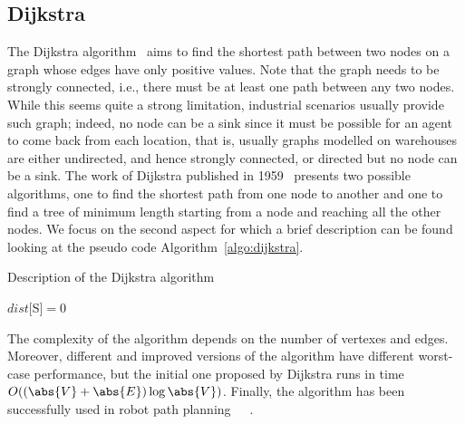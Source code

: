 \subsection{Dijkstra}
The Dijkstra algorithm~\cite{dijkstra} aims to find the shortest path 
between two nodes on a graph whose edges have only positive values. Note that
the graph needs to be strongly connected, i.e., there must be at least one path
between any two nodes. While this seems quite a strong limitation, industrial
scenarios usually provide such graph; indeed, no node can
be a sink since it must be possible for an agent to come back from each
location, that is, usually graphs modelled on warehouses are either undirected, 
and hence strongly connected, or directed but no node can be a sink. \newline
The work of Dijkstra published in 1959~\cite{dijkstra} presents two possible
algorithms, one to find the shortest path from one node to another and one to
find a tree of minimum length starting from a node and reaching all the other
nodes. We focus on the second aspect for which a brief description can be found
looking at the pseudo code Algorithm~\ref{algo:dijkstra}.
\begin{algorithm}
  \DontPrintSemicolon
  \caption{Description of the Dijkstra algorithm}
  \label{algo:dijkstra}

  \;

  \;

  $dist[$S$]=0$\;
  \;
\end{algorithm}\newline
The complexity of the algorithm depends on the number of vertexes and edges.
Moreover, different and improved versions of the algorithm have different
worst-case performance, but the initial one proposed by Dijkstra runs in time
$O((\abs{V}+\abs{E})\log\abs{V})$.\newline
Finally, the algorithm has been successfully used in robot path
planning~\cite{dijkstra1}~\cite{dijkstra2}~\cite{dijkstra3}.
%
%
